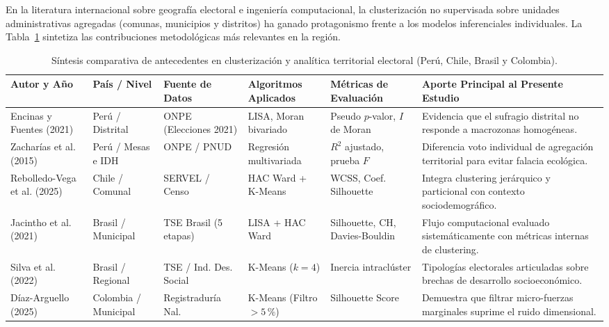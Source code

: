 \documentclass[conference,10pt,letterpaper]{IEEEtran}
\begin{document}
En la literatura internacional sobre geografía electoral e ingeniería computacional, la clusterización no supervisada sobre unidades administrativas agregadas (comunas, municipios y distritos) ha ganado protagonismo frente a los modelos inferenciales individuales. La Tabla~\ref{tab:antecedentes} sintetiza las contribuciones metodológicas más relevantes en la región.

\begin{table}[t]
\centering
\caption{Síntesis comparativa de antecedentes en clusterización y analítica territorial electoral (Perú, Chile, Brasil y Colombia).}
\label{tab:antecedentes}
\scriptsize
\renewcommand{\arraystretch}{0.92}
\begin{tabularx}{\textwidth}{@{} l p{2.3cm} p{2.4cm} p{2.5cm} p{2.4cm} X @{}}
\toprule
\textbf{Autor y Año} & \textbf{País / Nivel} & \textbf{Fuente de Datos} & \textbf{Algoritmos Aplicados} & \textbf{Métricas de Evaluación} & \textbf{Aporte Principal al Presente Estudio} \\
\midrule
Encinas y Fuentes (2021) \cite{encinas2021} & Perú / Distrital & ONPE (Elecciones 2021) & LISA, Moran bivariado & Pseudo $p$-valor, $I$ de Moran & Evidencia que el sufragio distrital no responde a macrozonas homogéneas. \\
Zacharías et al. (2015) \cite{zacharias2015} & Perú / Mesas e IDH & ONPE / PNUD & Regresión multivariada & $R^2$ ajustado, prueba $F$ & Diferencia voto individual de agregación territorial para evitar falacia ecológica. \\
Rebolledo-Vega et al. (2025) \cite{rebolledo2025} & Chile / Comunal & SERVEL / Censo & HAC Ward + K-Means & WCSS, Coef. Silhouette & Integra clustering jerárquico y particional con contexto sociodemográfico. \\
Jacintho et al. (2021) \cite{jacintho2021} & Brasil / Municipal & TSE Brasil (5 etapas) & LISA + HAC Ward & Silhouette, CH, Davies-Bouldin & Flujo computacional evaluado sistemáticamente con métricas internas de clustering. \\
Silva et al. (2022) \cite{silva2022} & Brasil / Regional & TSE / Ind. Des. Social & K-Means ($k = 4$) & Inercia intraclúster & Tipologías electorales articuladas sobre brechas de desarrollo socioeconómico. \\
Díaz-Arguello (2025) \cite{diaz2025} & Colombia / Municipal & Registraduría Nal. & K-Means (Filtro $> 5\,\%$) & Silhouette Score & Demuestra que filtrar micro-fuerzas marginales suprime el ruido dimensional. \\
\bottomrule
\end{tabularx}
\end{table}
\end{document}
